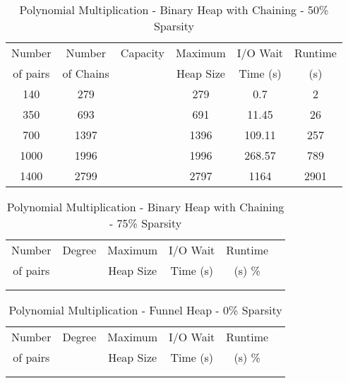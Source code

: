 \documentclass[11pt, one-sided]{amsart}
\begin{document}
\begin{table}[htbp]
   \centering
      \caption{Polynomial Multiplication - Binary Heap with Chaining - 50\% Sparsity}
   \begin{tabular}{|c|c|c|c|c|c|}
   	\hline
		 Number   & 	Number 	&Capacity		& Maximum	& I/O Wait		& Runtime 	 \\ 
		 of pairs 	&	of Chains	& 			&Heap Size	& Time (s)		&	(s)		 \\ \hline
		 140		&	279		&			&	279		&	0.7		&	2		\\
		 350		&	693		&			&	691		&	11.45	&	26		\\
		 700		&	1397		&			&	1396		&	109.11	&	257		\\
		1000		&	1996		&			&	1996		&	268.57	&	789		\\
		1400		&	2799		&			&	2797		&	1164		&	2901		\\
	\hline
   \end{tabular}
   \label{tab:booktabs}
\end{table}

\begin{table}[htbp]
   \centering
      \caption{Polynomial Multiplication - Binary Heap with Chaining - 75\% Sparsity}
   \begin{tabular}{|c|c|c|c|c|c|}
   	\hline
		 Number   & 	Degree	& Maximum & I/O Wait		& Runtime 	 \\ 
		 of pairs 	&			& Heap Size	& Time (s)		&	(s)		 		\%				\\ \hline
		 		&			&			&			&						\\
		 		&			&			&			&						\\
   \end{tabular}
   \label{tab:booktabs}
\end{table}







\newpage


\begin{table}[htbp]
   \centering
      \caption{Polynomial Multiplication - Funnel Heap - 0\% Sparsity}
   \begin{tabular}{|c|c|c|c|c|c|}
   	\hline
		 Number   & 	Degree	& Maximum & I/O Wait		&  Runtime  \\ 
		 of pairs 	&			& Heap Size	& Time (s)		&	(s)	 		\%				\\ \hline
		 		&			&			&			&					\\
		 		&			&			&			&					\\
   \end{tabular}
   \label{tab:booktabs}
\end{table}
\end{document}
